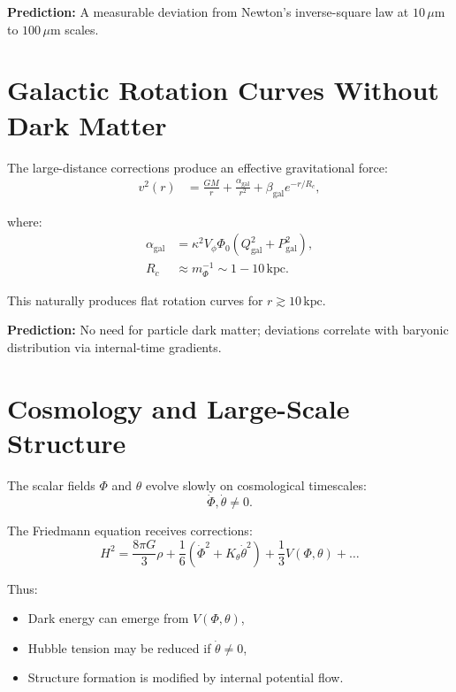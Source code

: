 \documentclass[12pt]{article}
\begin{document}
\textbf{Prediction:}  
A measurable deviation from Newton’s inverse-square law at \(10\,\mu\mathrm{m}\) to
\(100\,\mu\mathrm{m}\) scales.


\newpage
\section{Galactic Rotation Curves Without Dark Matter}

The large-distance corrections produce an effective gravitational force:
\begin{align}
v^2(r)
&=
\frac{GM}{r}
+ \frac{\alpha_{\text{gal}}}{r^2}
+ \beta_{\text{gal}}e^{-r/R_c},
\end{align}

where:
\begin{align}
\alpha_{\text{gal}}
&=
\kappa^2 V_\phi \Phi_0
(Q_{\text{gal}}^2 + P_{\text{gal}}^2),
\\
R_c &\approx m_\Phi^{-1} \sim 1 - 10\,\mathrm{kpc}.
\end{align}

This naturally produces flat rotation curves for
\(r \gtrsim 10\,\mathrm{kpc}\).

\textbf{Prediction:}  
No need for particle dark matter; deviations correlate with baryonic
distribution via internal-time gradients.


\newpage
\section{Cosmology and Large-Scale Structure}

The scalar fields \(\Phi\) and \(\theta\) evolve slowly on cosmological timescales:
\[
\dot{\Phi}, \dot{\theta} \neq 0.
\]

The Friedmann equation receives corrections:
\[
H^2
=
\frac{8\pi G}{3}\rho
+ \frac{1}{6}
\left(
\dot{\Phi}^2 + K_\theta\dot{\theta}^2
\right)
+ \frac{1}{3}V(\Phi,\theta)
+ \dots
\]

Thus:
\begin{itemize}
\item Dark energy can emerge from \(V(\Phi,\theta)\),
\item Hubble tension may be reduced if \(\dot{\theta}\neq 0\),
\item Structure formation is modified by internal potential flow.
\end{itemize}
\end{document}
